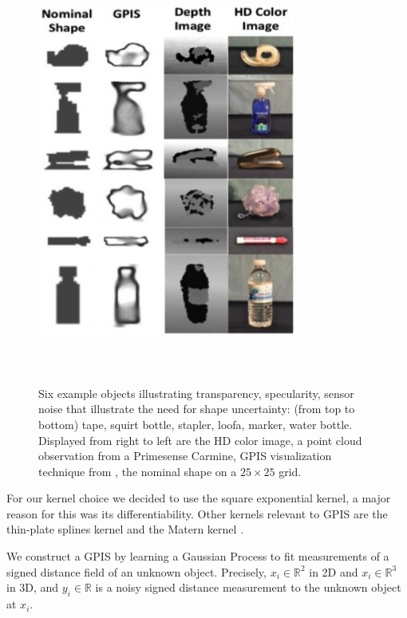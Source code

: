 \documentclass[letterpaper, 10 pt, conference]{ieeeconf}  %
\begin{document}
\begin{figure}[ht!]
\centering
\includegraphics[width = 8.5cm, height = 14cm ]{figures/Slide03.jpg}
\caption{\footnotesize Six example objects illustrating transparency, specularity, sensor noise that illustrate the need for shape uncertainty: (from top to bottom) tape, squirt bottle, stapler, loofa, marker, water bottle. Displayed from right to left are the HD color image, a point cloud observation from a Primesense Carmine, GPIS visualization technique from \cite{jeffs}, the nominal shape on a $25 \times 25$ grid.  }
\vspace*{-10pt}
\label{fig:GPIS_TSDF}
\end{figure}

For our kernel choice we decided to use the square exponential kernel, a major reason for this was its differentiability. Other kernels relevant to GPIS are the thin-plate splines kernel and the Matern kernel \cite{williams2007}. 

We construct a GPIS by learning a Gaussian Process to fit measurements of a signed distance field of an unknown object.  Precisely, $x_i \in \mathbb{R}^2$ in 2D and $x_i \in \mathbb{R}^3$ in 3D, and $y_i \in \mathbb{R}$ is a noisy signed distance measurement to the unknown object at $x_i$.
\end{document}
